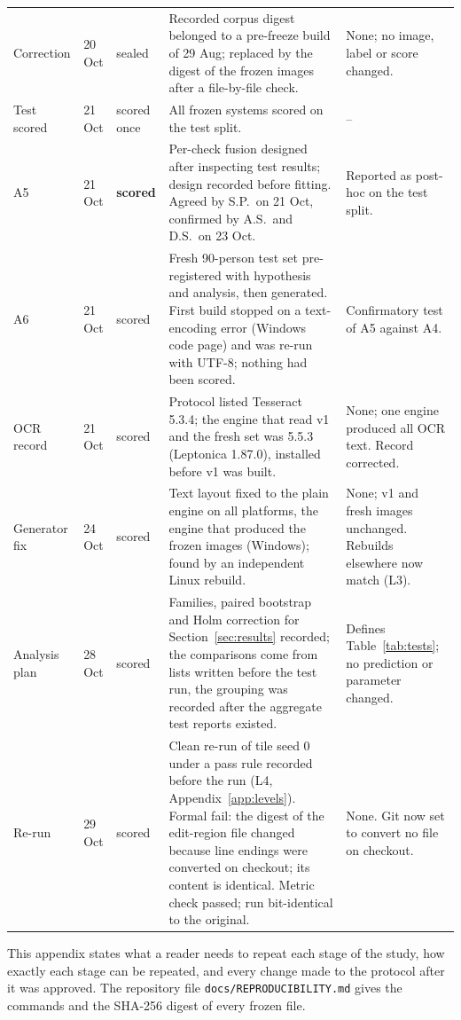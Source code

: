 \documentclass[conference]{IEEEtran}
\begin{document}
\begin{table}[!t]
\begin{tabular}{@{}l l l p{} p{}@{}}
Correction & 20 Oct & sealed
  & Recorded corpus digest belonged to a pre-freeze build of 29 Aug; replaced by the digest of the frozen images after a file-by-file check.
  & None; no image, label or score changed. \\
Test scored & 21 Oct & scored once & All frozen systems scored on the test split. & -- \\
A5 & 21 Oct & \textbf{scored}
  & Per-check fusion designed after inspecting test results; design recorded before fitting. Agreed by S.P.\ on 21 Oct, confirmed by A.S.\ and D.S.\ on 23 Oct.
  & Reported as post-hoc on the test split. \\
A6 & 21 Oct & scored
  & Fresh 90-person test set pre-registered with hypothesis and analysis, then generated. First build stopped on a text-encoding error (Windows code page) and was re-run with UTF-8; nothing had been scored.
  & Confirmatory test of A5 against A4. \\
OCR record & 21 Oct & scored
  & Protocol listed Tesseract 5.3.4; the engine that read v1 and the fresh set was 5.5.3 (Leptonica 1.87.0), installed before v1 was built.
  & None; one engine produced all OCR text. Record corrected. \\
Generator fix & 24 Oct & scored
  & Text layout fixed to the plain engine on all platforms, the engine that produced the frozen images (Windows); found by an independent Linux rebuild.
  & None; v1 and fresh images unchanged. Rebuilds elsewhere now match (L3). \\
Analysis plan & 28 Oct & scored
  & Families, paired bootstrap and Holm correction for Section~\ref{sec:results} recorded; the comparisons come from lists written before the test run, the grouping was recorded after the aggregate test reports existed.
  & Defines Table~\ref{tab:tests}; no prediction or parameter changed. \\
Re-run & 29 Oct & scored
  & Clean re-run of tile seed 0 under a pass rule recorded before the run (L4, Appendix~\ref{app:levels}). Formal fail: the digest of the edit-region file changed because line endings were converted on checkout; its content is identical. Metric check passed; run bit-identical to the original.
  & None. Git now set to convert no file on checkout. \\
\bottomrule
\end{tabular}
\end{table}

This appendix states what a reader needs to repeat each stage of the
study, how exactly each stage can be repeated, and every change made to
the protocol after it was approved. The repository file
\texttt{docs/REPRODUCIBILITY.md} gives the commands and the SHA-256
digest of every frozen file.
\end{document}
